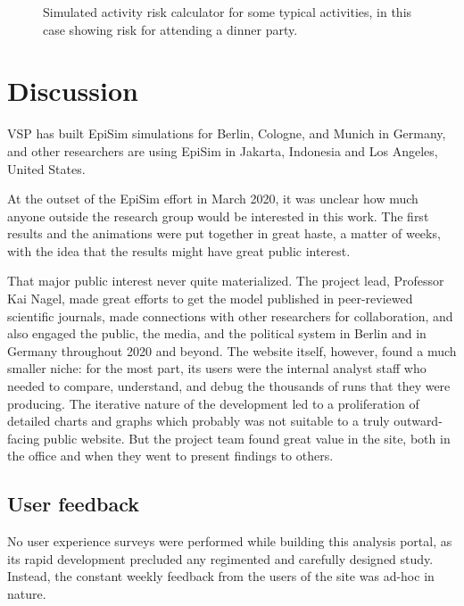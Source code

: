 \begin{figure}
\begin{minipage}{0.515\textwidth}
  \caption{Simulated activity risk calculator for some typical activities, in this case showing risk for attending a dinner party.}
  \label{fig:covid-personal-risk-calculator}
	\end{minipage}
\end{figure}




\hypertarget{covid-discussion}{%
\section{Discussion}\label{covid-discussion}}

VSP has built EpiSim simulations for Berlin, Cologne, and Munich in Germany, and other researchers are using EpiSim in Jakarta, Indonesia and Los Angeles, United States.

At the outset of the EpiSim effort in March 2020, it was unclear how much anyone outside the research group would be interested in this work. The first results and the animations were put together in great haste, a matter of weeks, with the idea that the results might have great public interest.

That major public interest never quite materialized. The project lead, Professor Kai Nagel, made great efforts to get the model published in peer-reviewed scientific journals, made connections with other researchers for collaboration, and also engaged the public, the media, and the political system in Berlin and in Germany throughout 2020 and beyond. The website itself, however, found a much smaller niche: for the most part, its users were the internal analyst staff who needed to compare, understand, and debug the thousands of runs that they were producing. The iterative nature of the development led to a proliferation of detailed charts and graphs which probably was not suitable to a truly outward-facing public website. But the project team found great value in the site, both in the office and when they went to present findings to others.

\hypertarget{covid-user-feedback}{%
\subsection{User feedback}\label{user-feedback}}

No user experience surveys were performed while building this analysis portal, as its rapid development precluded any regimented and carefully designed study. Instead, the constant weekly feedback from the users of the site was ad-hoc in nature.

